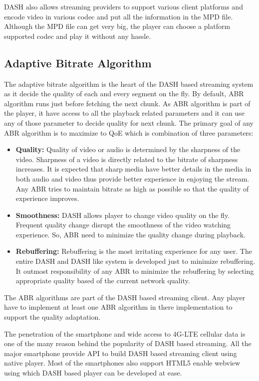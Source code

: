 DASH also allows streaming providers to support various client platforms and encode video in various codec and put all the information in the MPD file. Although the MPD file can get very big, the player can choose a platform supported codec and play it without any hassle.


\subsection{Adaptive Bitrate Algorithm}
The adaptive bitrate algorithm is the heart of the DASH based streaming system as it decide the quality of each and every segment on the fly. By default, ABR algorithm runs just before fetching the next chunk. As ABR algorithm is part of the player, it have access to all the playback related parameters and it can use any of those parameter to decide quality for next chunk. The primary goal of any ABR algorithm is to maximize to QoE which is combination of three parameters:
\begin{itemize}
	\item {\bf Quality:} Quality of video or audio is determined by the sharpness of the video. Sharpness of a video is directly related to the bitrate of sharpness increases. It is expected that sharp media have better details in the media in both audio and video thus provide better experience in enjoying the stream. Any ABR tries to maintain bitrate as high as possible so that the quality of experience improves.
	\item {\bf Smoothness:} DASH allows player to change video quality on the fly. Frequent quality change disrupt the smoothness of the video watching experience. So, ABR need to minimize the quality change during playback.
	\item {\bf Rebuffering:} Rebuffering is the most irritating experience for any user. The entire DASH and DASH like system is developed just to minimize rebuffering. It outmost responsibility of any ABR to minimize the rebuffering by selecting appropriate quality based of the current network quality.
\end{itemize}

The ABR algorithms are part of the DASH based streaming client. Any player have to implement at least one ABR algorithm in there implementation to support the quality adaptation.

The penetration of the smartphone and wide access to 4G-LTE cellular data is one of the many reason behind the popularity of DASH based streaming. All the major smartphone provide API to build DASH based streaming client using native player. Most of the smartphones also support HTML5 enable webview using which DASH based player can be developed at ease.

